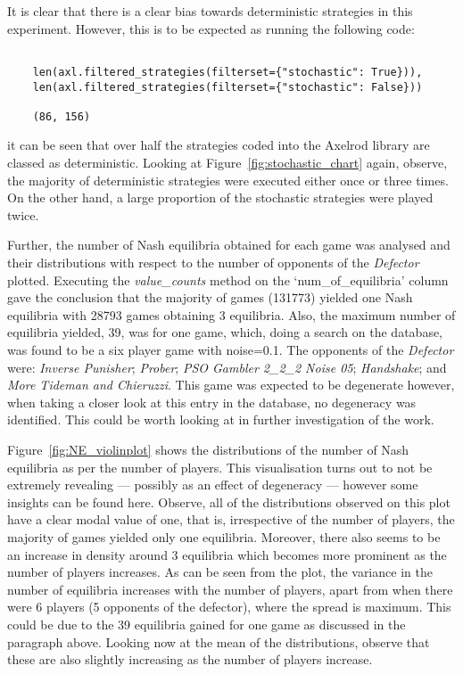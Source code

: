 It is clear that there is a clear bias towards deterministic strategies
in this experiment. However, this is to be expected as running the following
code:
\begin{verbatim}
    
    len(axl.filtered_strategies(filterset={"stochastic": True})), 
    len(axl.filtered_strategies(filterset={"stochastic": False}))

    (86, 156)
\end{verbatim}
it can be seen that over half the strategies coded into the Axelrod library are
classed as deterministic. Looking at Figure~\ref{fig:stochastic_chart} again,
observe, the majority of deterministic strategies were executed either once or
three times. On the other hand, a large proportion of the stochastic strategies
were played twice.

Further, the number of Nash equilibria obtained for each game was analysed and
their distributions with respect to the number of opponents of the
\textit{Defector} plotted. Executing the \textit{value\_counts} method on the
`num\_of\_equilibria' column gave the conclusion that the majority of games
(131773) yielded one Nash equilibria with 28793 games obtaining 3 equilibria.
Also, the maximum number of equilibria yielded, 39, was for one game, which,
doing a search on the database, was found to be a six player game with
noise=0.1. The opponents of the \textit{Defector} were: \textit{Inverse
Punisher}; \textit{Prober}; \textit{PSO Gambler 2\_2\_2 Noise 05};
\textit{Handshake}; and \textit{More Tideman and Chieruzzi}. This game was
expected to be degenerate however, when taking a closer look at this entry in
the database, no degeneracy was identified. This could be worth looking at in
further investigation of the work. 

Figure~\ref{fig:NE_violinplot} shows the distributions of the number of Nash
equilibria as per the number of players. This visualisation turns out to not be
extremely revealing --- possibly as an effect of degeneracy --- however some
insights can be found here. Observe, all of the distributions
observed on this plot have a clear modal value of one, that is, irrespective of
the number of players, the majority of games yielded only one equilibria.
Moreover, there also seems to be an increase in density around 3 equilibria
which becomes more prominent as the number of players increases. As can
be seen from the plot, the variance in the number of equilibria increases with
the number of players, apart from when there were 6 players (5 opponents of the
defector), where the spread is maximum. This could be due to the 39 equilibria
gained for one game as discussed in the paragraph above. Looking now at the mean
of the distributions, observe that these are also slightly increasing as the
number of players increase. 

